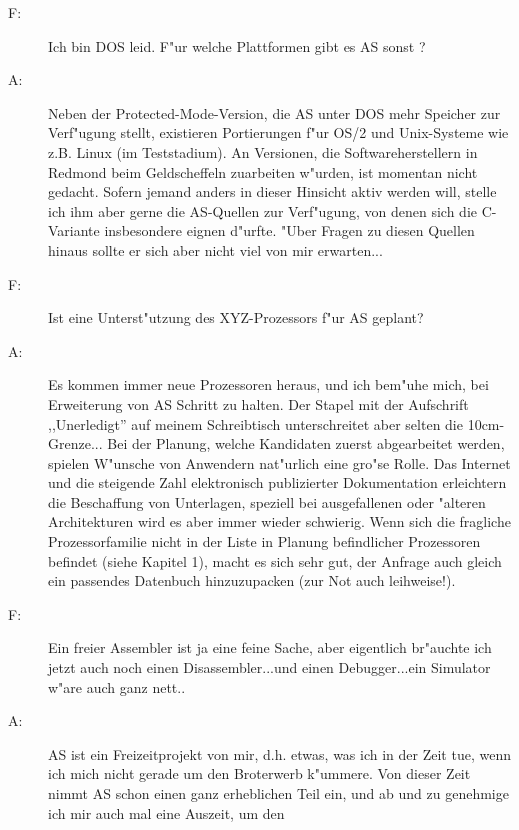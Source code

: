 \documentclass[12pt,a4paper,twoside]{report}
\begin{document}
\begin{description}
\item[F:]{Ich bin DOS leid.  F"ur welche Plattformen gibt es AS sonst ?}
\item[A:]{Neben der Protected-Mode-Version, die AS unter DOS mehr Speicher
         zur Verf"ugung stellt, existieren Portierungen f"ur OS/2 und
         Unix-Systeme wie z.B. Linux (im Teststadium).  An Versionen,
         die Softwareherstellern in Redmond beim Geldscheffeln zuarbeiten
         w"urden, ist momentan nicht gedacht.  Sofern jemand anders in
         dieser Hinsicht aktiv werden will, stelle ich ihm aber gerne
         die AS-Quellen zur Verf"ugung, von denen sich die C-Variante
         insbesondere eignen d"urfte.  "Uber Fragen zu diesen Quellen
         hinaus sollte er sich aber nicht viel von mir erwarten...}
\vspace{0.3cm}
\item[F:]{Ist eine Unterst"utzung des XYZ-Prozessors f"ur AS geplant?}
\item[A:]{Es kommen immer neue Prozessoren heraus, und ich bem"uhe
         mich, bei Erweiterung von AS Schritt zu halten.  Der Stapel
         mit der Aufschrift ,,Unerledigt'' auf meinem Schreibtisch
         unterschreitet aber selten die 10cm-Grenze... Bei der Planung,
         welche Kandidaten zuerst abgearbeitet werden, spielen W"unsche
         von Anwendern nat"urlich eine gro"se Rolle.  Das Internet und
         die steigende Zahl elektronisch publizierter Dokumentation
         erleichtern die Beschaffung von Unterlagen, speziell bei
         ausgefallenen oder "alteren Architekturen wird es aber immer
         wieder schwierig.  Wenn sich die fragliche Prozessorfamilie
         nicht in der Liste in Planung befindlicher Prozessoren
         befindet (siehe Kapitel 1), macht es sich sehr gut, der
         Anfrage auch gleich ein passendes Datenbuch hinzuzupacken
         (zur Not auch leihweise!).}
\vspace{0.3cm}
\item[F:]{Ein freier Assembler ist ja eine feine Sache, aber eigentlich
         br"auchte ich jetzt auch noch einen Disassembler...und einen
         Debugger...ein Simulator w"are auch ganz nett..}
\item[A:]{AS ist ein Freizeitprojekt von mir, d.h. etwas, was ich in der
         Zeit tue, wenn ich mich nicht gerade um den Broterwerb k"ummere.
         Von dieser Zeit nimmt AS schon einen ganz erheblichen Teil ein,
         und ab und zu genehmige ich mir auch mal eine Auszeit, um den
}
\end{description}
\end{document}
